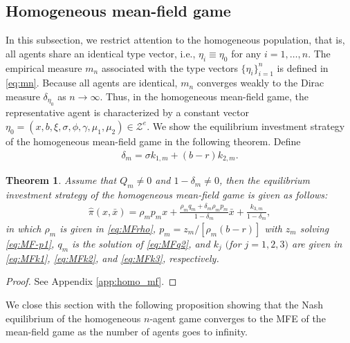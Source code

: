 \documentclass[11pt]{article}
\newtheorem{theorem}{Theorem}[section]
\numberwithin{equation}{section}
\begin{document}
\subsection{Homogeneous mean-field game}\label{subsec:MFH}
In this subsection, we restrict attention to the homogeneous population, that is, all agents share an identical
type vector, i.e., \(\eta_i \equiv \eta_0\) for any \(i = 1, \ldots, n\). The empirical measure \(m_n\) associated with the type vectors \(\{\eta_i\}_{i=1}^n\) is defined in \eqref{eq:mn}. Because all agents are identical, $m_n$ converges weakly to the Dirac measure \(\delta_{\eta_0}\) as \(n \to \infty\). Thus, in the homogeneous mean-field game, the representative agent is characterized by a constant vector $\eta_0 = (x, b, \xi, \sigma, \phi, \gamma, \mu_1, \mu_2) \in \mathcal{Z}^e$. We show the equilibrium investment strategy of the homogeneous mean-field game in the following theorem. Define
\begin{align}
\delta_{\scriptscriptstyle m} =  \sigma k_{1,m}+(b-r)k_{2,m}.
\end{align}
\begin{theorem}\label{th:homo_mefield}
Assume that \(Q_{\scriptscriptstyle m}\neq 0\) and $1-\delta_{\scriptscriptstyle m}\neq 0$, then
the equilibrium investment strategy of the homogeneous mean-field game is given as follows:
\begin{align}\label{eq:M-Hpifinal}
\widehat{\pi}(x,\bar{x}) =\rho_{\scriptscriptstyle m} p_{\scriptscriptstyle m} x+\frac{\rho_{\scriptscriptstyle m}q_{\scriptscriptstyle m}+\delta_{\scriptscriptstyle m}\rho_{\scriptscriptstyle m} p_{\scriptscriptstyle m}}{1-\delta_{\scriptscriptstyle m}}\bar{x}+\frac{k_{3,m}}{1-\delta_{\scriptscriptstyle m}},
\end{align}
in which \(\rho_{\scriptscriptstyle m}\) is given in \eqref{eq:MFrho},  \(p_{\scriptscriptstyle m}=z_{\scriptscriptstyle m}/[\rho_{\scriptscriptstyle m}(b-r)]\) with \(z_{\scriptscriptstyle m}\) solving  \eqref{eq:MF-p1}, \(q_{\scriptscriptstyle m}\) is the solution of \eqref{eq:MFq2}, and
\(k_j\) $($for \(j=1,2,3\)$)$ are given in \eqref{eq:MFk1}, \eqref{eq:MFk2}, and \eqref{eq:MFk3}, respectively.
\end{theorem}
\begin{proof}
See Appendix \ref{app:homo_mf}.
\end{proof}
We close this section with the following proposition showing that the Nash equilibrium of the homogeneous \(n\)-agent game converges to the MFE of the mean-field game as the number of agents goes to infinity.
	
\end{document}
